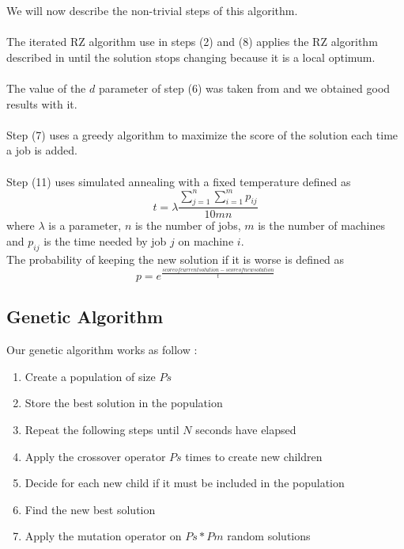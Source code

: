 \documentclass[a4paper,10pt]{article}
\begin{document}
	We will now describe the non-trivial steps of this algorithm. \\

	\paragraph{} The iterated RZ algorithm use in steps (2) and (8) applies the RZ algorithm described in \cite{rajendran1997efficient} until the solution stops changing because it is a local optimum.

	\paragraph{} The value of the $d$ parameter of step (6) was taken from \cite{panruiz2012} and we obtained good results with it.

	\paragraph{} Step (7) uses a greedy algorithm to maximize the score of the solution each time a job is added.

	\paragraph{} Step (11) uses simulated annealing with a fixed temperature defined as
	$$ t = \lambda \frac{\sum_{j=1}^{n}\sum_{i=1}^{m}p_{ij}}{10mn} $$ where $\lambda$ is a parameter, $n$ is the number of jobs, $m$ is the number of machines and $p_{ij}$ is the time needed by job $j$ on machine $i$. \\
	The probability of keeping the new solution if it is worse is defined as 
	$$ p = e^{\frac{score of current solution - score of new solution}{t}}$$

	\subsection{Genetic Algorithm}

		Our genetic algorithm works as follow : 
		\begin{enumerate}
			\item Create a population of size $Ps$
			\item Store the best solution in the population
			\item Repeat the following steps until $N$ seconds have elapsed
			\item Apply the crossover operator $Ps$ times to create new children
			\item Decide for each new child if it must be included in the population
			\item Find the new best solution
			\item Apply the mutation operator on $Ps * Pm$ random solutions
		\end{enumerate}
\end{document}
